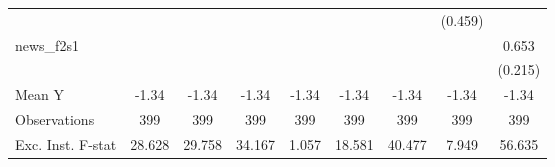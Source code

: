 {\begin{tabular}{l*{8}{c}}
            &                     &                     &                     &                     &                     &                     &     (0.459)         &                     \\
\addlinespace
news\_f2s1   &                     &                     &                     &                     &                     &                     &                     &       0.653\sym{***}\\
            &                     &                     &                     &                     &                     &                     &                     &     (0.215)         \\
\midrule
Mean Y      &       -1.34         &       -1.34         &       -1.34         &       -1.34         &       -1.34         &       -1.34         &       -1.34         &       -1.34         \\
Observations&         399         &         399         &         399         &         399         &         399         &         399         &         399         &         399         \\
Exc. Inst. F-stat&      28.628         &      29.758         &      34.167         &       1.057         &      18.581         &      40.477         &       7.949         &      56.635         \\
\bottomrule
\end{tabular}
}
